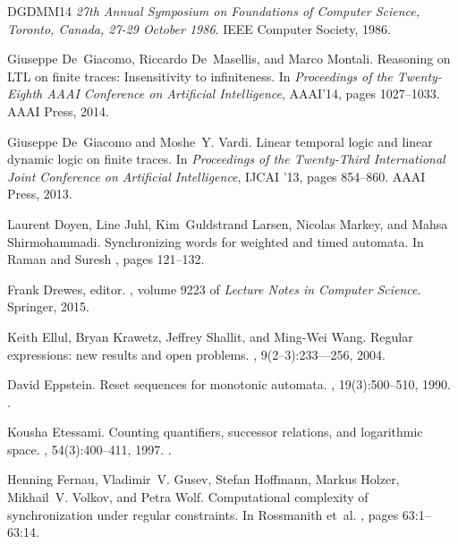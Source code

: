 \documentclass[11pt,a4paper]{amsart}
\theoremstyle{plain}
\theoremstyle{definition}
\theoremstyle{defC}
\theoremstyle{thmC}
\theoremstyle{plain}
\numberwithin{equation}{section}
\begin{document}
\begin{thebibliography}{DGDMM14}
{\em 27th Annual Symposium on Foundations of Computer Science, Toronto, Canada,
  27-29 October 1986}. {IEEE} Computer Society, 1986.

Giuseppe De~Giacomo, Riccardo De~Masellis, and Marco Montali.
\newblock Reasoning on {LTL} on finite traces: Insensitivity to infiniteness.
\newblock In {\em Proceedings of the Twenty-Eighth AAAI Conference on
  Artificial Intelligence}, AAAI'14, pages 1027--1033. AAAI Press, 2014.

Giuseppe De~Giacomo and Moshe~Y. Vardi.
\newblock Linear temporal logic and linear dynamic logic on finite traces.
\newblock In {\em Proceedings of the Twenty-Third International Joint
  Conference on Artificial Intelligence}, IJCAI '13, pages 854--860. AAAI
  Press, 2013.

Laurent Doyen, Line Juhl, Kim~Guldstrand Larsen, Nicolas Markey, and Mahsa
  Shirmohammadi.
\newblock Synchronizing words for weighted and timed automata.
\newblock In Raman and Suresh \cite{DBLP:conf/fsttcs/2014}, pages 121--132.

Frank Drewes, editor.
,
  volume 9223 of {\em Lecture Notes in Computer Science}. Springer, 2015.

Keith Ellul, Bryan Krawetz, Jeffrey Shallit, and Ming-Wei Wang.
\newblock Regular expressions: new results and open problems.
,
  9(2–3):233--–256, 2004.

David Eppstein.
\newblock Reset sequences for monotonic automata.
, 19(3):500--510, 1990.
\newblock \href {https://doi.org/10.1137/0219033} {}.

Kousha Etessami.
\newblock Counting quantifiers, successor relations, and logarithmic space.
, 54(3):400--411, 1997.
\newblock \href {https://doi.org/10.1006/JCSS.1997.1485}
  {}.

Henning Fernau, Vladimir~V. Gusev, Stefan Hoffmann, Markus Holzer, Mikhail~V.
  Volkov, and Petra Wolf.
\newblock Computational complexity of synchronization under regular
  constraints.
\newblock In Rossmanith et~al. \cite{DBLP:conf/mfcs/2019}, pages 63:1--63:14.


\end{thebibliography}
\end{document}
